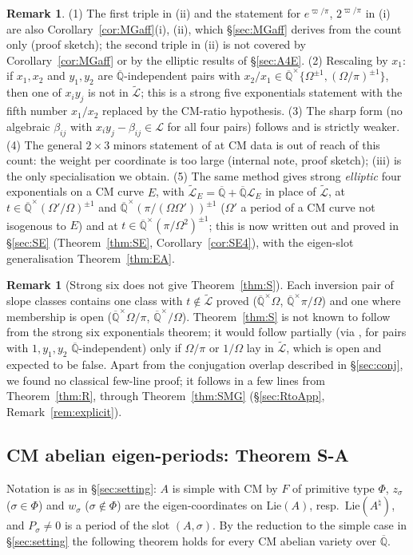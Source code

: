 \documentclass[11pt]{amsart}
\theoremstyle{definition}
\newtheorem{remark}[theorem]{Remark}
\newcommand{\Qb}{\overline{\mathbb{Q}}}
\newcommand{\Lg}{\mathcal{L}}
\newcommand{\Lt}{\widetilde{\mathcal{L}}}
\newcommand{\vp}{\varpi}
\begin{document}
\begin{remark}\label{rem:Sremarks}
(1) The first triple in (ii) and the statement for $e^{\vp/\pi}$, $2^{\vp/\pi}$ in (i) are also
Corollary~\ref{cor:MGaff}(i), (ii), which \S\ref{sec:MGaff} derives from the count only (proof sketch); the second triple
in (ii) is not covered by Corollary~\ref{cor:MGaff} or by the elliptic results of \S\ref{sec:A4E}. (2) Rescaling by $x_1$: if $x_1,x_2$ and $y_1,y_2$ are $\Qb$-independent pairs with
$x_2/x_1\in\Qb^\times\{\Omega^{\pm1},(\Omega/\pi)^{\pm1}\}$, then one of $x_iy_j$ is not in $\Lt$; this is a strong five
exponentials statement with the fifth number $x_1/x_2$ replaced by the CM-ratio hypothesis. (3) The sharp form (no
algebraic $\beta_{ij}$ with $x_iy_j-\beta_{ij}\in\Lg$ for all four pairs) follows and is strictly weaker. (4) The general
$2\times3$ minors statement of \cite[Thm.~1.2]{W05b} at CM data is out of reach of this count: the weight per coordinate
is too large (internal note, proof sketch); (iii) is the only specialisation we obtain. (5) The same method gives strong \emph{elliptic} four exponentials on a CM curve $E$, with $\Lt_E=\Qb+\Qb\Lg_E$
in place of $\Lt$, at $t\in\Qb^\times(\Omega'/\Omega)^{\pm1}$ and $\Qb^\times(\pi/(\Omega\Omega'))^{\pm1}$ ($\Omega'$ a period of a
CM curve not isogenous to $E$) and at $t\in\Qb^\times(\pi/\Omega^2)^{\pm1}$; this is now written out and proved in
\S\ref{sec:SE} (Theorem~\ref{thm:SE}, Corollary~\ref{cor:SE4}), with the eigen-slot generalisation Theorem~\ref{thm:EA}.
\end{remark}

\begin{remark}[Strong six does not give Theorem~\ref{thm:S}]\label{rem:strongsix}
Each inversion pair of slope classes contains one class with $t\notin\Lt$ proved ($\Qb^\times\Omega$, $\Qb^\times\pi/\Omega$) and
one where membership is open ($\Qb^\times\Omega/\pi$, $\Qb^\times/\Omega$). Theorem~\ref{thm:S} is not known to follow from the
strong six exponentials theorem; it would follow partially (via \cite[Cor.~1.3]{W05b}, for pairs with $1,y_1,y_2$
$\Qb$-independent) only if $\Omega/\pi$ or $1/\Omega$ lay in $\Lt$, which is open and expected to be false. Apart from the
conjugation overlap described in \S\ref{sec:conj}, we found no classical few-line proof; it follows in a few lines from Theorem~\ref{thm:R}, through
Theorem~\ref{thm:SMG} (\S\ref{sec:RtoApp}, Remark~\ref{rem:explicit}).
\end{remark}

\subsection{CM abelian eigen-periods: Theorem S-A}\label{sec:SA}
Notation is as in \S\ref{sec:setting}: $A$ is simple with CM by $F$ of primitive type $\Phi$, $z_\sigma$ ($\sigma\in\Phi$) and
$w_\sigma$ ($\sigma\notin\Phi$) are the eigen-coordinates on $\mathrm{Lie}(A)$, resp.\ $\mathrm{Lie}(A^\natural)$, and
$P_\sigma\ne0$ is a period of the slot $(A,\sigma)$. By the reduction to the simple case in \S\ref{sec:setting} the following
theorem holds for every CM abelian variety over $\Qb$.
\end{document}
